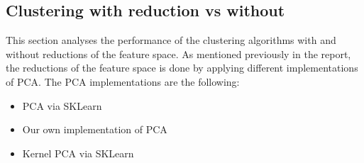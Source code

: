 \subsection{Clustering with reduction vs without}
\label{subsec:clustering-with-reduction-vs-without}

This section analyses the performance of the clustering algorithms with and without reductions of the feature space.
As mentioned previously in the report, the reductions of the feature space is done by applying different
implementations of PCA. The PCA implementations are the following:

\begin{itemize}
    \item PCA via SKLearn
    \item Our own implementation of PCA
    \item Kernel PCA via SKLearn
\end{itemize}







